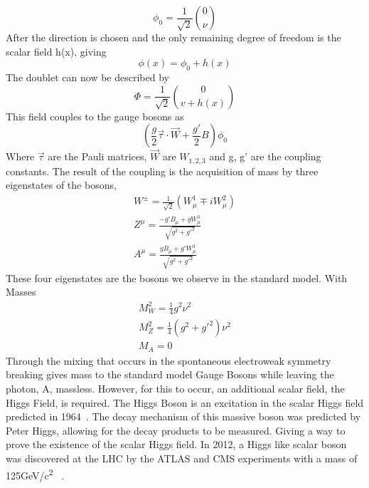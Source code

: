  
\begin{equation}
\phi_{0} = \frac{1}{\sqrt{2}} \binom{0}{\nu}
\end{equation}
After the direction is chosen and the only remaining degree of freedom is the scalar field h(x), giving 
\begin{equation}
\phi(x) = \phi_{0} + h(x)
\end{equation}
The doublet can now be described by 
\begin{equation}
\Phi = \frac{1}{\sqrt{2}} \binom{0}{v+h(x)}
\end{equation}
This field couples to the gauge bosons as 
\begin{equation}
(\frac{g}{2}\overrightarrow{\tau}\cdot \overrightarrow{W} + \frac{g'}{2}B)\phi_{0}
\end{equation}
Where ${\overrightarrow{\tau}}$ are the Pauli matrices, ${\overrightarrow{W}}$ are ${W_{1,2,3}}$ and g, g' are the coupling constants. The result of the coupling is the acquisition of mass by three eigenstates of the bosons, 
\begin{equation}
\begin{split}
W^{\pm} = \frac{1}{\sqrt{2}}(W^{1}_{\mu} \mp iW^{2}_{\mu})\\
Z^{\mu} = \frac{-g'B_{\mu} + gW^{3}_{\mu}}{\sqrt{g^{2} + g'^{2}}}\\
A^{\mu} = \frac{gB_{\mu} + g'W^{3}_{\mu}}{\sqrt{g^{2} + g'^{2}}}
\end{split}
\end{equation}
These four eigenstates are the bosons we observe in the standard model. With Masses
\begin{equation}
\begin{split}
M^{2}_{W} = \frac{1}{4}g^{2}\nu^{2} \\
M^{2}_{Z} = \frac{1}{4}(g^{2} + g'^{2})\nu^{2} \\
M_{A} = 0
\end{split}
\end{equation}
Through the mixing that occurs in the spontaneous electroweak symmetry breaking gives mass to the standard model Gauge Bosons while leaving the photon, A, massless. However, for this to occur, an additional scalar field, the Higgs Field, is required.\linebreak
\indent The Higgs Boson is an excitation in the scalar Higgs field predicted in 1964~\cite{PhysRevLett.13.508}. The decay mechanism of this massive boson was predicted by Peter Higgs, allowing for the decay products to be measured. Giving a way to prove the existence of the scalar Higgs field. In 2012, a Higgs like scalar boson was discovered at the LHC by the ATLAS and CMS experiments with a mass of 125GeV/c\textsuperscript{2} ~\cite{Aad:2012tfa}.

